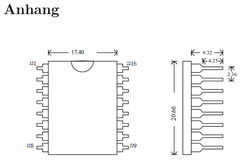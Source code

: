 \chapter{Anhang}
\thispagestyle{fancy}  
\blindtext \cite{Minder2013}\\

\begin{figure}[h]
\centering
\includegraphics[scale=0.5]{Bilder/footprint_wtv020.png}
\label{fig:irgendesBild}
\caption[Abmessungen WTV020]{\blindtext}
\end{figure}